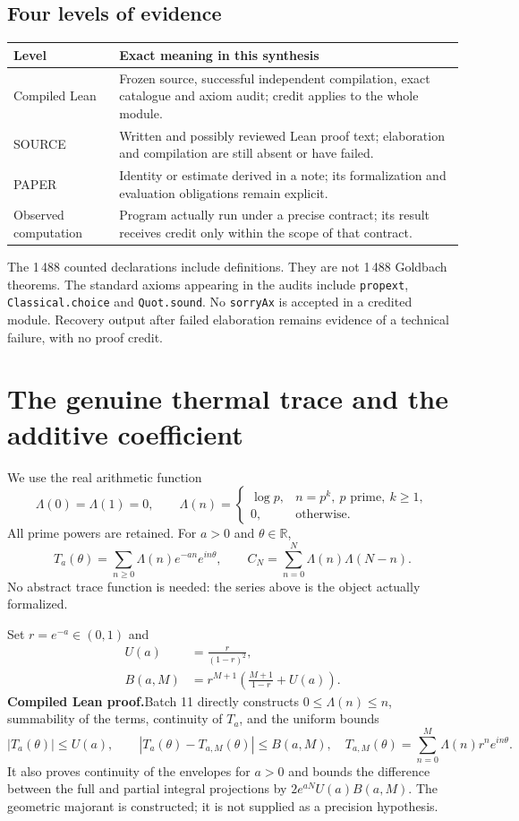 \documentclass[11pt,a4paper]{article}
\theoremstyle{remark}
\newcommand{\Lam}{\Lambda}
\newcommand{\R}{\mathbb R}
\newcommand{\paid}{\textbf{Compiled Lean proof.}\space}
\begin{document}
\subsection*{Four levels of evidence}
\begin{tabularx}{\textwidth}{@{}p{29mm}Y@{}}
\toprule
Level & Exact meaning in this synthesis\\
\midrule
Compiled Lean & Frozen source, successful independent compilation, exact
catalogue and axiom audit; credit applies to the whole module.\\
SOURCE & Written and possibly reviewed Lean proof text; elaboration and
compilation are still absent or have failed.\\
PAPER & Identity or estimate derived in a note; its formalization and
evaluation obligations remain explicit.\\
Observed computation & Program actually run under a precise contract;
its result receives credit only within the scope of that contract.\\
\bottomrule
\end{tabularx}
The 1\,488 counted declarations include definitions. They are not 1\,488
Goldbach theorems. The standard axioms appearing in the audits include
\texttt{propext}, \texttt{Classical.choice} and \texttt{Quot.sound}.
No \texttt{sorryAx} is accepted in a credited module. Recovery output after
failed elaboration remains evidence of a technical failure, with no proof credit.

\clearpage
\section{The genuine thermal trace and the additive coefficient}\label{sec:heat}
We use the real arithmetic function
\[
\Lam(0)=\Lam(1)=0,\qquad
\Lam(n)=\begin{cases}\log p,&n=p^k,\ p\text{ prime},\ k\ge1,\\0,&\text{otherwise}.
\end{cases}
\]
All prime powers are retained. For $a>0$ and $\theta\in\R$,
\begin{equation}\label{eq:heat}
T_a(\theta)=\sum_{n\ge0}\Lam(n)e^{-an}e^{in\theta},\qquad
C_N=\sum_{n=0}^{N}\Lam(n)\Lam(N-n).
\end{equation}
No abstract trace function is needed: the series above is the object
actually formalized.

Set $r=e^{-a}\in(0,1)$ and
\begin{align}
U(a)&=\frac{r}{(1-r)^2},\label{eq:U}\\
B(a,M)&=r^{M+1}\left(\frac{M+1}{1-r}+U(a)\right).
\label{eq:heat-tail}
\end{align}
\paid Batch 11 directly constructs $0\le\Lam(n)\le n$, summability
of the terms, continuity of $T_a$, and the uniform bounds
\[
|T_a(\theta)|\le U(a),\qquad
|T_a(\theta)-T_{a,M}(\theta)|\le B(a,M),
\quad T_{a,M}(\theta)=\sum_{n=0}^{M}\Lam(n)r^ne^{in\theta}.
\]
It also proves continuity of the envelopes for $a>0$ and bounds the difference
between the full and partial integral projections by
$2e^{aN}U(a)B(a,M)$. The geometric majorant is constructed; it is not
supplied as a precision hypothesis.
\end{document}
